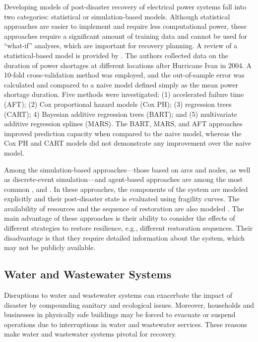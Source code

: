 Developing models of post-disaster recovery of electrical power systems fall into two categories:  statistical or simulation-based models. Although statistical approaches are easier to implement and require less computational power, these approaches require a significant amount of training data and cannot be used for ``what-if'' analyses, which are important for recovery planning. A review of a statistical-based model is provided by \citet{liu2007statistical}. The authors collected data on the duration of power shortages at different locations after Hurricane Ivan in 2004. A 10-fold cross-validation method was employed, and the out-of-sample error was calculated and compared to a naive model defined simply as the mean power shortage duration. Five methods were investigated: (1) accelerated failure time (AFT); (2) Cox proportional hazard models (Cox PH); (3) regression trees (CART); 4) Bayesian additive regression trees (BART); and (5) multivariate additive regression splines (MARS). The BART, MARS, and AFT approaches improved prediction capacity when compared to the naive model, whereas the Cox PH and CART models did not demonstrate any improvement over the naive model. \ 

Among the simulation-based approaches---those based on arcs and nodes, as well as discrete-event simulation---and agent-based approaches are among the most common \citep{Eusgeld2008a,ouyang2014review}, and \citep{sun2019resilience}. In these approaches, the components of the system are modeled explicitly and their post-disaster state is evaluated using fragility curves. The availability of resources and the sequence of restoration are also modeled \citep{ouyang2014multi}. The main advantage of these approaches is their ability to consider the effects of different strategies to restore resilience, e.g., different restoration sequences. Their disadvantage is that they require detailed information about the system, which may not be publicly available. \ 

\subsection{Water and Wastewater Systems}
Disruptions to water and wastewater systems can exacerbate the impact of disaster by compounding sanitary and ecological issues. Moreover, households and businesses in physically safe buildings may be forced to evacuate or suspend operations due to interruptions in water and wastewater services. These reasons make water and wastewater systems pivotal for recovery.\

